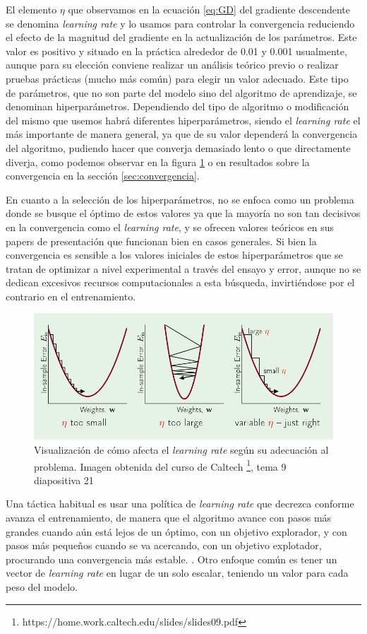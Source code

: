 El elemento $\eta$ que observamos en la ecuación \ref{eq:GD} del gradiente descendente se denomina \textit{learning rate} y lo usamos para controlar la convergencia reduciendo el efecto de la magnitud del gradiente en la actualización de los parámetros. Este valor es positivo y situado en la práctica alrededor de 0.01 y 0.001 usualmente, aunque para su elección conviene realizar un análisis teórico previo o realizar pruebas prácticas (mucho más común) para elegir un valor adecuado. Este tipo de parámetros, que no son parte del modelo sino del algoritmo de aprendizaje, se denominan hiperparámetros. Dependiendo del tipo de algoritmo o modificación del mismo que usemos habrá diferentes hiperparámetros, siendo el \textit{learning rate} el más importante de manera general, ya que de su valor dependerá la convergencia del algoritmo, pudiendo hacer que converja demasiado lento o que directamente diverja, como podemos observar en la figura \ref{fig:lr} o en resultados sobre la convergencia en la sección \ref{sec:convergencia}.

En cuanto a la selección de los hiperparámetros, no se enfoca como un problema donde se busque el óptimo de estos valores ya que la mayoría no son tan decisivos en la convergencia como el \textit{learning rate}, y se ofrecen valores teóricos en sus papers de presentación que funcionan bien en casos generales. Si bien la convergencia es sensible a los valores iniciales de estos hiperparámetros que se tratan de optimizar a nivel experimental a través del ensayo y error, aunque no se dedican excesivos recursos computacionales a esta búsqueda, invirtiéndose por el contrario en el entrenamiento.



\begin{figure}
    \centering
    \includegraphics[width=0.5\linewidth]{Plantilla_TFG_latex//imagenes//Mat//GD/lr.png}
    \caption{Visualización de cómo afecta el \textit{learning rate} según su adecuación al problema. Imagen obtenida del curso de Caltech \footnote{https://home.work.caltech.edu/slides/slides09.pdf}, tema 9 diapositiva 21}
    \label{fig:lr}
\end{figure}

Una táctica habitual es usar una política de \textit{learning rate} que decrezca conforme avanza el entrenamiento, de manera que el algoritmo avance con pasos más grandes cuando aún está lejos de un óptimo, con un objetivo explorador, y con pasos más pequeños cuando se va acercando, con un objetivo explotador, procurando una convergencia más estable. \cite{GoodFellowBook}. Otro enfoque común es tener un vector de \textit{learning rate} en lugar de un solo escalar, teniendo un valor para cada peso del modelo. 





